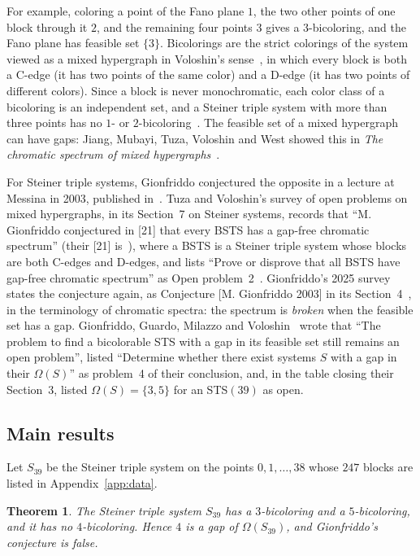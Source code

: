 \documentclass[11pt]{article}
\newtheorem{theorem}{Theorem}
\theoremstyle{definition}
\begin{document}
For example, coloring a point of the Fano plane $1$, the two other points
of one block through it $2$, and the remaining four points $3$ gives a
$3$-bicoloring, and the Fano plane has feasible set $\{3\}$.
Bicolorings are the strict colorings of the system viewed as a mixed
hypergraph in Voloshin's sense~\cite{Voloshin95}, in which every block is
both a C-edge (it has two points of the same color) and a D-edge (it has
two points of different colors). Since a block is never monochromatic,
each color class of a bicoloring is an independent set, and a Steiner
triple system with more than three points has no $1$- or
$2$-bicoloring~\cite[Section~1]{CDR}. The
feasible set of a mixed hypergraph can have gaps: Jiang, Mubayi, Tuza,
Voloshin and West showed this in \emph{The chromatic spectrum of mixed
hypergraphs}~\cite{JMTVW}.

For Steiner triple systems, Gionfriddo conjectured the opposite in a
lecture at Messina in 2003, published in~\cite{Gionfriddo03}. Tuza and
Voloshin's survey of open problems on mixed hypergraphs, in its Section~7
on Steiner systems, records that ``M. Gionfriddo conjectured in [21] that
every BSTS has a gap-free chromatic spectrum'' (their [21]
is~\cite{Gionfriddo03}), where a BSTS is a Steiner
triple system whose blocks are both C-edges and D-edges, and lists ``Prove
or disprove that all BSTS have gap-free chromatic spectrum'' as Open
problem~2~\cite{TV08}. Gionfriddo's 2025 survey states the conjecture
again, as Conjecture [M. Gionfriddo 2003] in its
Section~4~\cite{Gionfriddo25}, in the terminology of chromatic spectra:
the spectrum is \emph{broken} when the feasible set has a gap. Gionfriddo, Guardo, Milazzo and
Voloshin~\cite{GGMV14} wrote that ``The problem to find a bicolorable STS
with a gap in its feasible set still remains an open problem'', listed
``Determine whether there exist systems $S$ with a gap in their
$\Omega(S)$'' as problem~4 of their conclusion, and, in the table closing
their Section~3, listed $\Omega(S)=\{3,5\}$ for an STS$(39)$ as open.

\subsection{Main results}

Let $S_{39}$ be the Steiner triple system on the points $0,1,\dots,38$
whose $247$ blocks are listed in Appendix~\ref{app:data}.

\begin{theorem}\label{thm:main}
The Steiner triple system $S_{39}$ has a $3$-bicoloring and a
$5$-bicoloring, and it has no $4$-bicoloring. Hence $4$ is a gap of
$\Omega(S_{39})$, and Gionfriddo's conjecture is false.
\end{theorem}
\end{document}
